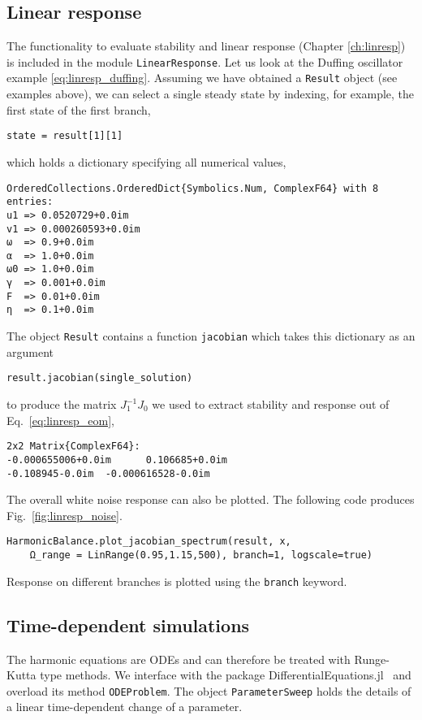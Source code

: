 \subsection{Linear response}
The functionality to evaluate stability and linear response (Chapter \ref{ch:linresp}) is included in the module \texttt{LinearResponse}. Let us look at the Duffing oscillator example \eqref{eq:linresp_duffing}. Assuming we have obtained a \texttt{Result} object (see examples above), we can select a single steady state by indexing, for example, the first state of the first branch,
\begin{lstlisting}[numbers=none]
state = result[1][1]
\end{lstlisting}
which holds a dictionary specifying all numerical values,
\begin{lstlisting}[numbers=none, basicstyle=\scriptsize\ttfamily]
OrderedCollections.OrderedDict{Symbolics.Num, ComplexF64} with 8 entries:
u1 => 0.0520729+0.0im
v1 => 0.000260593+0.0im
ω  => 0.9+0.0im
α  => 1.0+0.0im
ω0 => 1.0+0.0im
γ  => 0.001+0.0im
F  => 0.01+0.0im
η  => 0.1+0.0im
\end{lstlisting}
The object \texttt{Result} contains a function \texttt{jacobian} which takes this dictionary as an argument
\begin{lstlisting}[numbers=none]
result.jacobian(single_solution)
\end{lstlisting}
to produce the matrix $J_1^{-1} J_0$ we used to extract stability and response out of Eq.~\eqref{eq:linresp_eom},
\begin{lstlisting}[numbers=none, extendedchars=true, basicstyle=\scriptsize\ttfamily]
2x2 Matrix{ComplexF64}:
-0.000655006+0.0im      0.106685+0.0im
-0.108945-0.0im  -0.000616528-0.0im
\end{lstlisting}
The overall white noise response can also be plotted. The following code produces Fig.~\ref{fig:linresp_noise}. 
\begin{lstlisting}[numbers=none]
HarmonicBalance.plot_jacobian_spectrum(result, x, 
	Ω_range = LinRange(0.95,1.15,500), branch=1, logscale=true)
\end{lstlisting}
Response on different branches is plotted using the \texttt{branch} keyword. 

\subsection{Time-dependent simulations} 

The harmonic equations are ODEs and can therefore be treated with Runge-Kutta type methods. We interface with the package DifferentialEquations.jl~\cite{Rackauskas_2017} and overload its method \texttt{ODEProblem}. The object \texttt{ParameterSweep} holds the details of a linear time-dependent change of a parameter.

